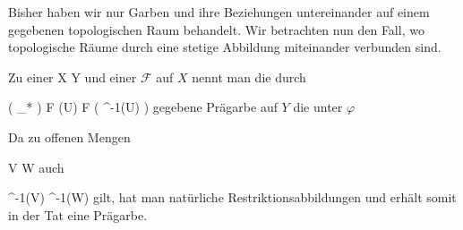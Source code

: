 
Bisher haben wir nur Garben und ihre Beziehungen untereinander auf einem gegebenen topologischen Raum behandelt. Wir betrachten nun den Fall, wo topologische Räume durch eine stetige Abbildung miteinander verbunden sind.


{}
{





Zu einer
\maabbdisp {\varphi} { X } { Y
} {}
und einer
${ \mathcal  F   }$ auf $X$ nennt man die durch

\mavergleichskettedisp
{\vergleichskette
{ \left(  \varphi_*  \right) { \mathcal  F   }  (U)
}
{ } { { \mathcal  F   } \left(  \varphi^{-1}(U)  \right)
}
{ } {
}
{ } {
}
{ } {
}
}
{}{}{}
gegebene Prägarbe auf $Y$ die unter $\varphi$





}
Da zu offenen Mengen

\mavergleichskette
{\vergleichskette
{V
}
{ \subseteq }{W
}
{  }{
}
{    }{
}
{   }{
}
}
{}{}{}
auch

\mavergleichskette
{\vergleichskette
{\varphi^{-1}(V)
}
{ \subseteq }{\varphi^{-1}(W)
}
{  }{
}
{    }{
}
{   }{
}
}
{}{}{}
gilt, hat man natürliche Restriktionsabbildungen und erhält somit in der Tat eine Prägarbe.





